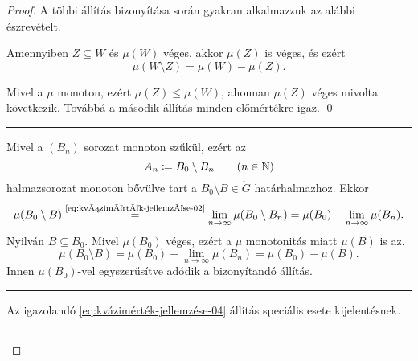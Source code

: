 \documentclass[
]{elteikthesis}[2024/04/26]
\begin{document}
\begin{proof}
		\newpage

		A többi állítás bizonyítása során gyakran alkalmazzuk az alábbi észrevételt.
		
		\begin{lem*}
			Amennyiben \( Z \subseteq W \) és \( \mu(W) \) véges,
			akkor \( \mu(Z) \) is véges, és ezért
			\[
				\mu(W \setminus Z) = \mu(W) - \mu(Z).
			\]
		\end{lem*}
		\begin{proof*}
			Mivel a \( \mu \) monoton, ezért \( \mu(Z) \leq \mu(W) \), 
			ahonnan \( \mu(Z) \) véges mivolta következik.
			Továbbá a második állítás minden előmértékre igaz. \qed
		\end{proof*}
		
		\vspace{9pt}
		\hrule
		\vspace{9pt}
		
		\fbox{\ref{eq:kvázimérték-jellemzése-02} \( \Longrightarrow \)
			  \ref{eq:kvázimérték-jellemzése-03}}
		Mivel a \( (B_n) \) sorozat monoton szűkül, ezért az 
		\[
			A_n \coloneq B_0 \setminus B_n \qquad (n \in \mathbb{N})
		\]
		halmazsorozat monoton bővülve tart a \( B_0 \setminus B \in \ring{G} \) határhalmazhoz.
		Ekkor
		\[
			\mu(B_0 \setminus B) \overset{\text{\ref{eq:kvázimérték-jellemzése-02}}}{=}
			\lim_{n \to \infty} \mu(B_0 \setminus B_n) =
			\mu(B_0) - \lim_{n \to \infty} \mu(B_n).
		\]
		Nyilván \( B \subseteq B_0 \). 
		Mivel \( \mu(B_0) \) véges, ezért a \( \mu \) monotonitás miatt \( \mu(B) \) is az.
		\[
			\mu(B_0 \setminus B) =
			\mu(B_0) - \lim_{n \to \infty} \mu(B_n) =
			\mu(B_0) - \mu(B).
		\]
		Innen \( \mu(B_0) \)-vel egyszerűsítve adódik a bizonyítandó állítás.
		
		\vspace{9pt}
		\hrule
		\vspace{9pt}
		
		\fbox{\ref{eq:kvázimérték-jellemzése-03} \( \Longrightarrow \)
			  \ref{eq:kvázimérték-jellemzése-04}}
		Az igazolandó \ref{eq:kvázimérték-jellemzése-04} állítás speciális esete  kijelentésnek.
		
		\vspace{9pt}
		\hrule
		\vspace{9pt}
		

\end{proof}
\end{document}
